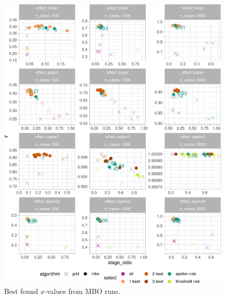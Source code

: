\documentclass[bimj,fleqn]{w-art}
\theoremstyle{plain}
\theoremstyle{definition}
\begin{document}
\begin{figure}[htb]
\centering
\includegraphics[width=\linewidth]{generated/figures/plot_best_x.pdf}
\caption{Best found $x$-values from MBO runs.}
\label{fig:plot_best_x}
\end{figure}
\end{document}
